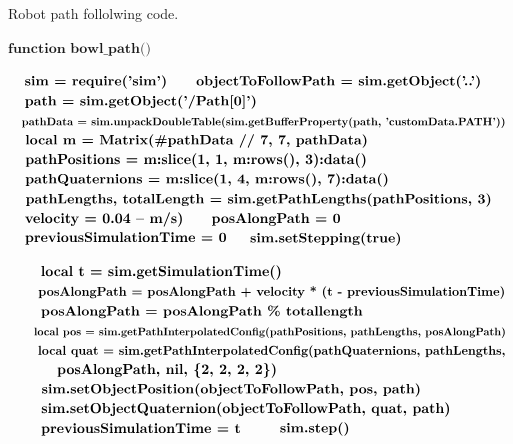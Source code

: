 \documentclass[lettersize,journal]{IEEEtran}
\begin{document}
\begin{algorithm}[H]
\caption{Robot path follolwing code.}\label{alg:alg2}
\begin{algorithmic}
\STATE 
\STATE \hspace{0.5cm}$ \textbf{function bowl\_path() }  $

\STATE \hspace{0.5cm}$ \textbf{\quad sim = require('sim') }  $
\STATE \hspace{0.5cm}$ \textbf{\quad objectToFollowPath = sim.getObject('..') }  $
\STATE \hspace{0.5cm}$ \textbf{\quad path = sim.getObject('/Path[0]') }  $
\STATE \hspace{0.5cm}$ \textbf{\quad pathData = sim.unpackDoubleTable(sim.getBufferProperty(path, 'customData.PATH')) }  $
\STATE \hspace{0.5cm}$ \textbf{\quad local m = Matrix(\#pathData // 7, 7, pathData) }  $
\STATE \hspace{0.5cm}$ \textbf{\quad pathPositions = m:slice(1, 1, m:rows(), 3):data() }  $
\STATE \hspace{0.5cm}$ \textbf{\quad pathQuaternions = m:slice(1, 4, m:rows(), 7):data() }  $
\STATE \hspace{0.5cm}$ \textbf{\quad pathLengths, totalLength = sim.getPathLengths(pathPositions, 3) }  $
\STATE \hspace{0.5cm}$ \textbf{\quad     velocity = 0.04 -- m/s) }  $
\STATE \hspace{0.5cm}$ \textbf{\quad posAlongPath = 0}  $
\STATE \hspace{0.5cm}$ \textbf{\quad previousSimulationTime = 0}  $
\STATE \hspace{0.5cm}$ \textbf{\quad sim.setStepping(true) }  $

\STATE \hspace{0.5cm}$ \textbf{\quad \quad local t = sim.getSimulationTime() }  $
\STATE \hspace{0.5cm}$ \textbf{\quad \quad posAlongPath = posAlongPath + velocity * (t - previousSimulationTime) }  $
\STATE \hspace{0.5cm}$ \textbf{\quad \quad posAlongPath = posAlongPath \% totallength}  $
\STATE \hspace{0.5cm}$ \textbf{\quad \quad local pos = sim.getPathInterpolatedConfig(pathPositions, pathLengths, posAlongPath) }  $
\STATE \hspace{0.5cm}$ \textbf{\quad \quad  local quat = sim.getPathInterpolatedConfig(pathQuaternions, pathLengths, }  $
\STATE \hspace{0.5cm}$ \textbf{\quad \quad \quad posAlongPath, nil, \{2, 2, 2, 2\}) }  $
\STATE \hspace{0.5cm}$ \textbf{\quad \quad sim.setObjectPosition(objectToFollowPath, pos, path) }  $
\STATE \hspace{0.5cm}$ \textbf{\quad \quad sim.setObjectQuaternion(objectToFollowPath, quat, path) }  $
\STATE \hspace{0.5cm}$ \textbf{\quad \quad previousSimulationTime = t}  $
\STATE \hspace{0.5cm}$ \textbf{\quad \quad sim.step() }  $


\end{algorithmic}
\end{algorithm}
\end{document}

